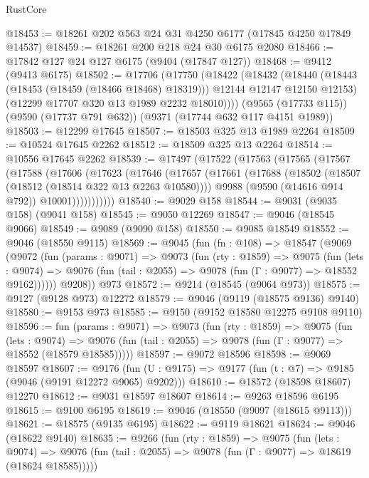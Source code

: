 \begin{lexlean}{RustCore}
\begin{coremodule}
@18453 := @18261 @202 @563 @24 @31 @4250 @6177 (@17845 @4250 @17849 @14537)
@18459 := @18261 @200 @218 @24 @30 @6175 @2080
@18466 := @17842 @127 @24 @127 @6175 (@9404 (@17847 @127))
@18468 := @9412 (@9413 @6175)
@18502 := @17706
    (@17750
      (@18422
        (@18432
          (@18440 (@18443 (@18453 (@18459 (@18466 @18468) @18319))) @12144 @12147 @12150 @12153)
          (@12299 @17707 @320 @13 @1989 @2232 @18010))))
    (@9565 (@17733 @115))
    (@9590 (@17737 @791 @632))
    (@9371 (@17744 @632 @117 @4151 @1989))
@18503 := @12299 @17645
@18507 := @18503 @325 @13 @1989 @2264
@18509 := @10524 @17645 @2262
@18512 := @18509 @325 @13 @2264
@18514 := @10556 @17645 @2262
@18539 := @17497
    (@17522
      (@17563
        (@17565
          (@17567
            (@17588
              (@17606
                (@17623
                  (@17646
                    (@17657
                      (@17661
                        (@17688
                          (@18502 (@18507 (@18512 (@18514 @322 @13 @2263 @10580))))
                          @9988
                          (@9590 (@14616 @914 @792))
                          @10001)))))))))))
@18540 := @9029 @158
@18544 := @9031 (@9035 @158) (@9041 @158)
@18545 := @9050 @12269
@18547 := @9046 (@18545 @9066)
@18549 := @9089 (@9090 @158)
@18550 := @9085 @18549
@18552 := @9046 (@18550 @9115)
@18569 := @9045
    (fun (fn : @108) =>
    @18547
      (@9069
        (@9072
          (fun (params : @9071) =>
          @9073
            (fun (rty : @1859) =>
            @9075
              (fun (lets : @9074) =>
              @9076 (fun (tail : @2055) => @9078 (fun (Γ : @9077) => @18552 @9162))))))
        @9208))
    @973
@18572 := @9214 (@18545 (@9064 @973))
@18575 := @9127 (@9128 @973) @12272
@18579 := @9046 (@9119 (@18575 @9136) @9140)
@18580 := @9153 @973
@18585 := @9150 (@9152 @18580 @12275 @9108 @9110)
@18596 := fun (params : @9071) =>
  @9073
    (fun (rty : @1859) =>
    @9075
      (fun (lets : @9074) =>
      @9076 (fun (tail : @2055) => @9078 (fun (Γ : @9077) => @18552 (@18579 @18585)))))
@18597 := @9072 @18596
@18598 := @9069 @18597
@18607 := @9176
    (fun (U : @9175) => @9177 (fun (t : @7) => @9185 (@9046 (@9191 @12272 @9065) @9202)))
@18610 := @18572 (@18598 @18607) @12270
@18612 := @9031 @18597 @18607
@18614 := @9263 @18596 @6195
@18615 := @9100 @6195
@18619 := @9046 (@18550 (@9097 (@18615 @9113)))
@18621 := @18575 (@9135 @6195)
@18622 := @9119 @18621
@18624 := @9046 (@18622 @9140)
@18635 := @9266
    (fun (rty : @1859) =>
    @9075
      (fun (lets : @9074) =>
      @9076 (fun (tail : @2055) => @9078 (fun (Γ : @9077) => @18619 (@18624 @18585)))))

\end{coremodule}
\end{lexlean}
